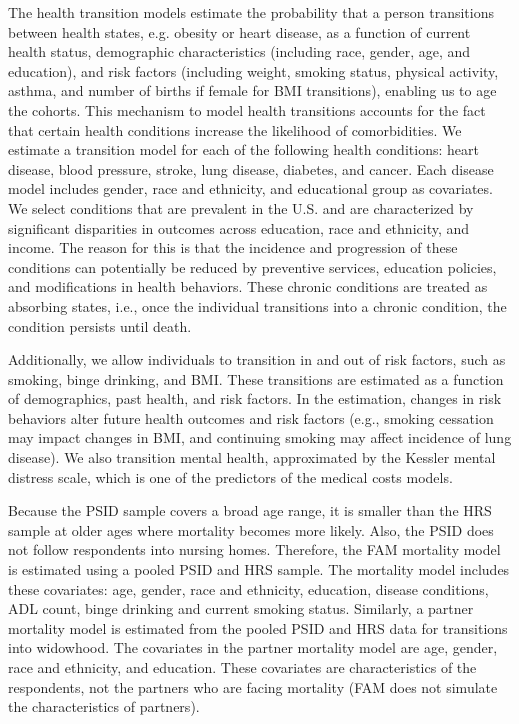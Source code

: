 \noindent The health transition models estimate the probability that a person transitions between health states, e.g. obesity or heart disease, as a function of current health status, demographic characteristics (including race, gender, age, and education), and risk factors (including weight, smoking status, physical activity, asthma, and number of births if female for BMI transitions), enabling us to age the cohorts. This mechanism to model health transitions accounts for the fact that certain health conditions increase the likelihood of comorbidities.
We estimate a transition model for each of the following health conditions: heart disease, blood pressure, stroke, lung disease, diabetes, and cancer. Each disease model includes gender, race and ethnicity, and educational group as covariates.
We select conditions that are prevalent in the U.S. and are characterized by significant disparities in outcomes across education, race and ethnicity, and income.
The reason for this is that the incidence and progression of these conditions can potentially be reduced by preventive services, education policies, and modifications in health behaviors.
These chronic conditions are treated as absorbing states, i.e., once the individual transitions into a chronic condition, the condition persists until death.

\noindent Additionally, we allow individuals to transition in and out of risk factors, such as smoking, binge drinking, and BMI. These transitions are estimated as a function of demographics, past health, and risk factors.
In the estimation, changes in risk behaviors alter future health outcomes and risk factors (e.g., smoking cessation may impact changes in BMI, and continuing smoking may affect incidence of lung disease). We also transition mental health, approximated by the Kessler mental distress scale, which is one of the predictors of the medical costs models.


\noindent Because the PSID sample covers a broad age range, it is smaller than the HRS sample at older ages where mortality becomes more likely. Also, the PSID does not follow respondents into nursing homes.
Therefore, the FAM mortality model is estimated using a pooled PSID and HRS sample.
The mortality model includes these covariates: age, gender, race and ethnicity, education, disease conditions, ADL count, binge drinking and current smoking status.
Similarly, a partner mortality model is estimated from the pooled PSID and HRS data for transitions into widowhood.
The covariates in the partner mortality model are age, gender, race and ethnicity, and education.
These covariates are characteristics of the respondents, not the partners who are facing mortality (FAM does not simulate the characteristics of partners).


